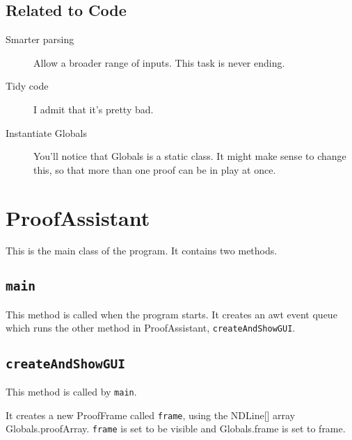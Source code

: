 \documentclass[a4paper]{article}
\begin{document}
\subsection{Related to Code}
\begin{description}
	\item[Smarter parsing] Allow a broader range of inputs. This task is never ending.
	\item[Tidy code] I admit that it's pretty bad.
	\item[Instantiate Globals] You'll notice that Globals is a static class. It might make sense to change this, so that more than one proof can be in play at once.
\end{description}



































\section{ProofAssistant}
\label{appendixStart}
This is the main class of the program. It contains two methods.

\subsection{\texttt{main}}
This method is called when the program starts. It creates an awt event queue which runs the other method in ProofAssistant, \texttt{createAndShowGUI}.

\subsection{\texttt{createAndShowGUI}}
This method is called by \texttt{main}.

It creates a new ProofFrame called \texttt{frame}, using the NDLine[] array Globals.proofArray. \texttt{frame} is set to be visible and  Globals.frame is set to frame.
\end{document}
